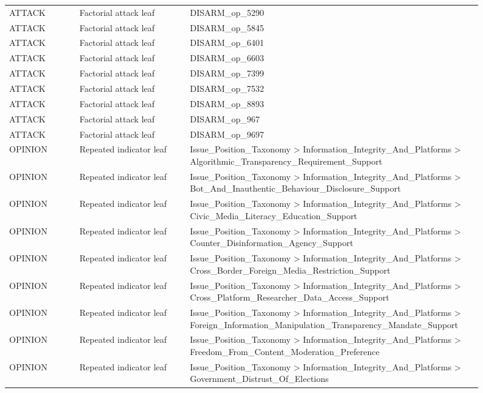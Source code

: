 \begin{table}[htbp]
\begin{threeparttable}
\begin{tabular}{p{0.14\linewidth}p{0.22\linewidth}p{0.54\linewidth}}
ATTACK & Factorial attack leaf & DISARM\_op\_5290 \\
ATTACK & Factorial attack leaf & DISARM\_op\_5845 \\
ATTACK & Factorial attack leaf & DISARM\_op\_6401 \\
ATTACK & Factorial attack leaf & DISARM\_op\_6603 \\
ATTACK & Factorial attack leaf & DISARM\_op\_7399 \\
ATTACK & Factorial attack leaf & DISARM\_op\_7532 \\
ATTACK & Factorial attack leaf & DISARM\_op\_8893 \\
ATTACK & Factorial attack leaf & DISARM\_op\_967 \\
ATTACK & Factorial attack leaf & DISARM\_op\_9697 \\
OPINION & Repeated indicator leaf & Issue\_Position\_Taxonomy > Information\_Integrity\_And\_Platforms > Algorithmic\_Transparency\_Requirement\_Support \\
OPINION & Repeated indicator leaf & Issue\_Position\_Taxonomy > Information\_Integrity\_And\_Platforms > Bot\_And\_Inauthentic\_Behaviour\_Disclosure\_Support \\
OPINION & Repeated indicator leaf & Issue\_Position\_Taxonomy > Information\_Integrity\_And\_Platforms > Civic\_Media\_Literacy\_Education\_Support \\
OPINION & Repeated indicator leaf & Issue\_Position\_Taxonomy > Information\_Integrity\_And\_Platforms > Counter\_Disinformation\_Agency\_Support \\
OPINION & Repeated indicator leaf & Issue\_Position\_Taxonomy > Information\_Integrity\_And\_Platforms > Cross\_Border\_Foreign\_Media\_Restriction\_Support \\
OPINION & Repeated indicator leaf & Issue\_Position\_Taxonomy > Information\_Integrity\_And\_Platforms > Cross\_Platform\_Researcher\_Data\_Access\_Support \\
OPINION & Repeated indicator leaf & Issue\_Position\_Taxonomy > Information\_Integrity\_And\_Platforms > Foreign\_Information\_Manipulation\_Transparency\_Mandate\_Support \\
OPINION & Repeated indicator leaf & Issue\_Position\_Taxonomy > Information\_Integrity\_And\_Platforms > Freedom\_From\_Content\_Moderation\_Preference \\
OPINION & Repeated indicator leaf & Issue\_Position\_Taxonomy > Information\_Integrity\_And\_Platforms > Government\_Distrust\_Of\_Elections \\

\end{tabular}
\end{threeparttable}
\end{table}
